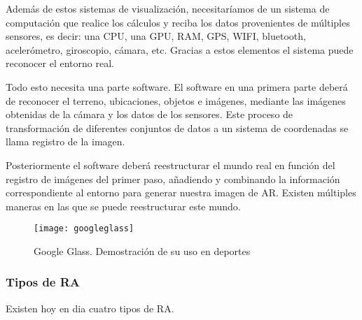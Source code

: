 Además de estos sistemas de visualización, necesitaríamos de un sistema de computación que realice los cálculos y reciba los datos provenientes de múltiples sensores, es decir: una CPU, una GPU, RAM, GPS, WIFI, bluetooth, acelerómetro, giroscopio, cámara, etc. Gracias a estos elementos el sistema puede reconocer el entorno real.

Todo esto necesita una parte software. El software en una primera parte deberá de reconocer el terreno, ubicaciones, objetos e imágenes, mediante las imágenes obtenidas de la cámara y los datos de los sensores. Este proceso de transformación de diferentes conjuntos de datos a un sistema de coordenadas se llama registro de la imagen. 

Posteriormente el software deberá reestructurar el mundo real en función del registro de imágenes\cite{URL::ImageRegister} del primer paso, añadiendo y combinando la información correspondiente al entorno para generar nuestra imagen de AR. Existen múltiples maneras en las que se puede reestructurar este mundo. 

\begin{figure}[h]
	\centering
	\texttt{[image: googleglass]}
	\caption{Google Glass. Demostración de su uso en deportes}
	\label{fig:googleglass}
\end{figure}

\subsubsection{Tipos de RA}

Existen hoy en dia cuatro tipos de RA.

